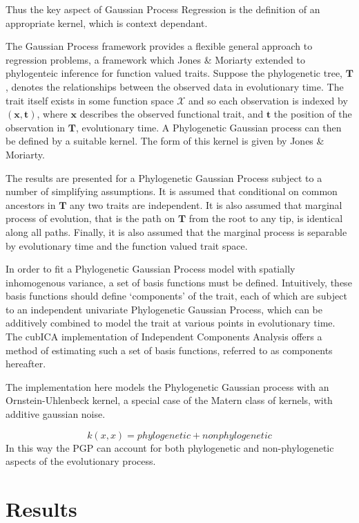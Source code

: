 \documentclass[wsdraft]{ws-rv9x6} %
\begin{document}
Thus the key aspect of Gaussian Process Regression is the definition of an appropriate kernel, which is context dependant. 

The Gaussian Process framework provides a flexible general approach to regression problems, a framework which Jones \& Moriarty extended to phylogenteic inference for function valued traits. Suppose the phylogenetic tree, \(\mathbf{T}\), denotes the relationships between the observed data in evolutionary time. The trait itself exists in some function space \(\mathcal{X}\) and so each observation is indexed by \((\mathbf{x}, \mathbf{t})\), where \(\mathbf{x}\) describes the observed functional trait, and \(\mathbf{t}\) the position of the observation in \(\mathbf{T}\), evolutionary time. A Phylogenetic Gaussian process can then be defined by a suitable kernel. The form of this kernel is given by Jones \& Moriarty.\cite{jones2013evolutionary}

The results are presented for a Phylogenetic Gaussian Process subject to a number of simplifying assumptions. It is assumed that conditional on common ancestors in \(\mathbf{T}\) any two traits are independent. It is also assumed that marginal process of evolution, that is the path on \(\mathbf{T}\) from the root to any tip, is identical along all paths. Finally, it is also assumed that the marginal process is separable by evolutionary time and the function valued trait space.

In order to fit a Phylogenetic Gaussian Process model with spatially inhomogenous variance, a set of basis functions must be defined. Intuitively, these basis functions should define `components' of the trait, each of which are subject to an independent univariate Phylogenetic Gaussian Process, which can be additively combined to model the trait at various points in evolutionary time. The cubICA\cite{blaschke2004cubica} implementation of Independent Components Analysis offers a method of estimating such a set of basis functions, referred to as components hereafter.

The implementation here models the Phylogenetic Gaussian process with an Ornstein-Uhlenbeck kernel, a special case of the Matern class of kernels, with additive gaussian noise. 

\[
k(x, x) = phylogenetic + nonphylogenetic
\]
In this way the PGP can account for both  phylogenetic and non-phylogenetic aspects of the evolutionary process.

\section{Results}
\end{document}

